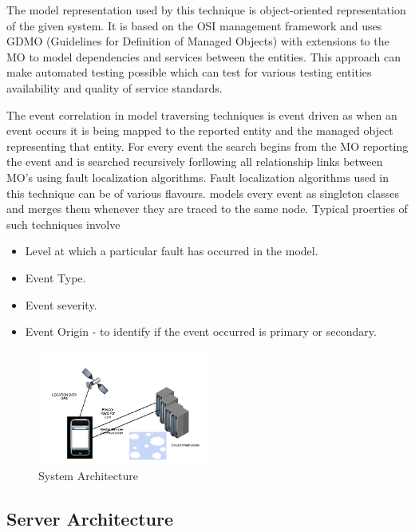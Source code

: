 \documentclass[10pt]{sigplan-proc-varsize}
\begin{document}
The model representation used by this technique is object-oriented representation of the given system. It is based on the OSI management framework and uses GDMO (Guidelines for  Definition  of Managed Objects) with extensions to the MO to model dependencies and services between the entities. This approach can make automated testing possible which can test for various testing entities availability and quality of service standards. 

The event correlation in model traversing techniques is event driven as when an event occurs it is being mapped to the reported entity and the managed object representing that entity. For every event the search begins from the MO reporting the event and is searched recursively forllowing all relationship links between MO's using fault localization algorithms.  Fault localization algorithms used in this technique can be of various flavours.  models every event as singleton classes and merges them whenever they are traced to the same node. Typical proerties of such techniques involve 

\begin{itemize}
  \item Level at which a particular fault has occurred in the model.
  \item Event Type.
  \item Event severity.
  \item Event Origin - to identify if the event occurred is primary or secondary.
\end{itemize}

\begin{figure}[h!]
  \caption{System Architecture}
  \centering
    \includegraphics[width=0.5\textwidth]{Traffic_Analyzer}
\end{figure}


\subsection{Server Architecture}
\end{document}
